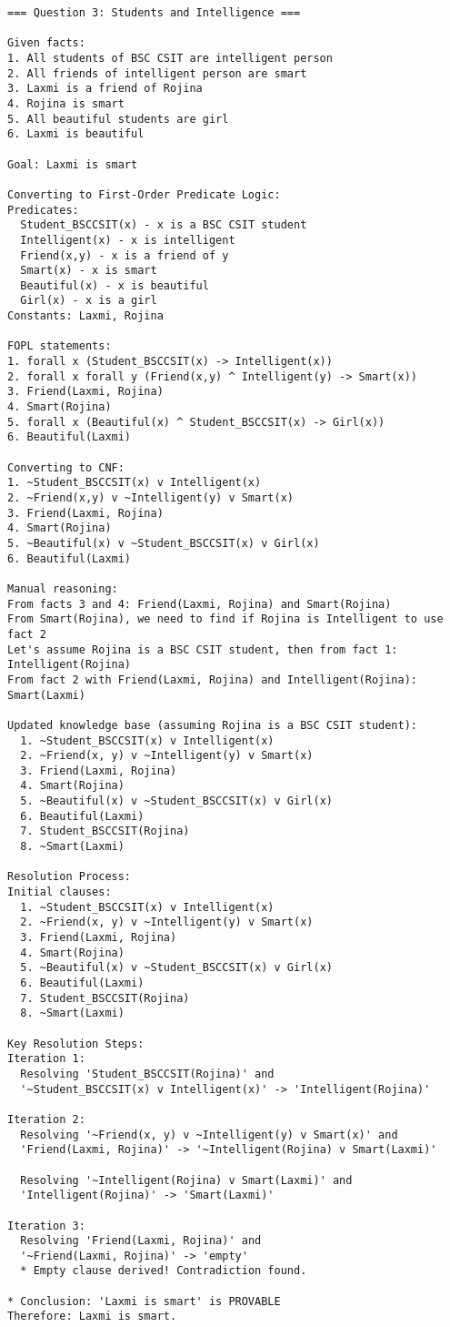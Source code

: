 \documentclass[11pt,a4paper]{article}
\begin{document}
\begin{lstlisting}[caption=FOPL Resolution Output - Student Intelligence,basicstyle=\ttfamily\tiny]
=== Question 3: Students and Intelligence ===

Given facts:
1. All students of BSC CSIT are intelligent person
2. All friends of intelligent person are smart
3. Laxmi is a friend of Rojina
4. Rojina is smart
5. All beautiful students are girl
6. Laxmi is beautiful

Goal: Laxmi is smart

Converting to First-Order Predicate Logic:
Predicates:
  Student_BSCCSIT(x) - x is a BSC CSIT student
  Intelligent(x) - x is intelligent
  Friend(x,y) - x is a friend of y
  Smart(x) - x is smart
  Beautiful(x) - x is beautiful
  Girl(x) - x is a girl
Constants: Laxmi, Rojina

FOPL statements:
1. forall x (Student_BSCCSIT(x) -> Intelligent(x))
2. forall x forall y (Friend(x,y) ^ Intelligent(y) -> Smart(x))
3. Friend(Laxmi, Rojina)
4. Smart(Rojina)
5. forall x (Beautiful(x) ^ Student_BSCCSIT(x) -> Girl(x))
6. Beautiful(Laxmi)

Converting to CNF:
1. ~Student_BSCCSIT(x) v Intelligent(x)
2. ~Friend(x,y) v ~Intelligent(y) v Smart(x)
3. Friend(Laxmi, Rojina)
4. Smart(Rojina)
5. ~Beautiful(x) v ~Student_BSCCSIT(x) v Girl(x)
6. Beautiful(Laxmi)

Manual reasoning:
From facts 3 and 4: Friend(Laxmi, Rojina) and Smart(Rojina)
From Smart(Rojina), we need to find if Rojina is Intelligent to use fact 2
Let's assume Rojina is a BSC CSIT student, then from fact 1: Intelligent(Rojina)
From fact 2 with Friend(Laxmi, Rojina) and Intelligent(Rojina): Smart(Laxmi)

Updated knowledge base (assuming Rojina is a BSC CSIT student):
  1. ~Student_BSCCSIT(x) v Intelligent(x)
  2. ~Friend(x, y) v ~Intelligent(y) v Smart(x)
  3. Friend(Laxmi, Rojina)
  4. Smart(Rojina)
  5. ~Beautiful(x) v ~Student_BSCCSIT(x) v Girl(x)
  6. Beautiful(Laxmi)
  7. Student_BSCCSIT(Rojina)
  8. ~Smart(Laxmi)

Resolution Process:
Initial clauses:
  1. ~Student_BSCCSIT(x) v Intelligent(x)
  2. ~Friend(x, y) v ~Intelligent(y) v Smart(x)
  3. Friend(Laxmi, Rojina)
  4. Smart(Rojina)
  5. ~Beautiful(x) v ~Student_BSCCSIT(x) v Girl(x)
  6. Beautiful(Laxmi)
  7. Student_BSCCSIT(Rojina)
  8. ~Smart(Laxmi)

Key Resolution Steps:
Iteration 1:
  Resolving 'Student_BSCCSIT(Rojina)' and 
  '~Student_BSCCSIT(x) v Intelligent(x)' -> 'Intelligent(Rojina)'

Iteration 2:
  Resolving '~Friend(x, y) v ~Intelligent(y) v Smart(x)' and 
  'Friend(Laxmi, Rojina)' -> '~Intelligent(Rojina) v Smart(Laxmi)'
  
  Resolving '~Intelligent(Rojina) v Smart(Laxmi)' and 
  'Intelligent(Rojina)' -> 'Smart(Laxmi)'

Iteration 3:
  Resolving 'Friend(Laxmi, Rojina)' and 
  '~Friend(Laxmi, Rojina)' -> 'empty'
  * Empty clause derived! Contradiction found.

* Conclusion: 'Laxmi is smart' is PROVABLE
Therefore: Laxmi is smart.
\end{lstlisting}
\end{document}
